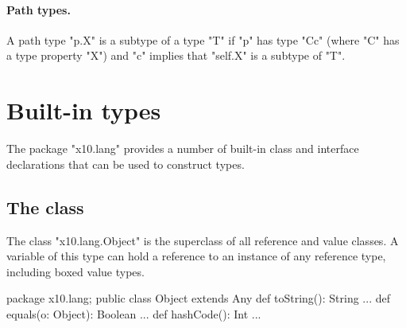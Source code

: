 \paragraph{Path types.}

A path type \xcd"p.X" is a subtype of a type \xcd"T" if
\xcd"p" has type \xcd"C{c}" (where \xcd"C" has a type property
\xcd"X") and \xcd"c" implies that \xcd"self.X" is a subtype of \xcd"T".




\section{Built-in types}

The package \xcd"x10.lang" provides a number of built-in class and
interface declarations that can be used to construct types.


\subsection{The class }
\label{Object}

The class \xcd"x10.lang.Object" is the superclass of all
reference and value classes.
A variable of this type can hold a reference to an instance of any
reference type, including boxed value types.

\begin{xten}
package x10.lang;
public class Object extends Any {
  def toString(): String {...}
  def equals(o: Object): Boolean {...}
  def hashCode(): Int {...}
}
\end{xten}

